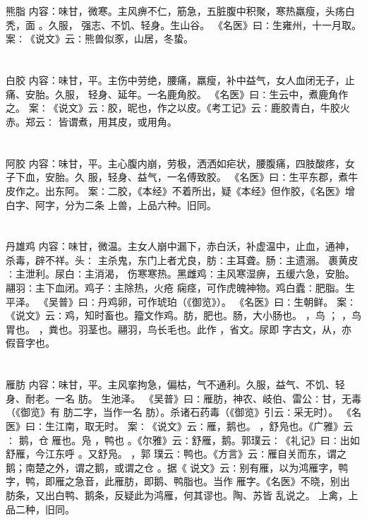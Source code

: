 \documentclass[12pt,UTF8]{ctexbook}
\begin{document}
\chapter{}熊脂
内容：味甘，微寒。主风痹不仁，筋急，五脏腹中积聚，寒热羸瘦，头疡白秃，面 。久服， 
强志、不饥、轻身。生山谷。 
《名医》曰∶生雍州，十一月取。 
案∶《说文》云∶熊兽似豕，山居，冬蛰。 


\chapter{}白胶
内容：味甘，平。主伤中劳绝，腰痛，羸瘦，补中益气，女人血闭无子，止痛、安胎。久服， 
轻身、延年。一名鹿角胶。 
《名医》曰∶生云中，煮鹿角作之。 
案∶《说文》云∶胶，昵也，作之以皮。《考工记》云∶鹿胶青白，牛胶火赤。郑云∶ 
皆谓煮，用其皮，或用角。 


\chapter{}阿胶
内容：味甘，平。主心腹内崩，劳极，洒洒如疟状，腰腹痛，四肢酸疼，女子下血，安胎。久 
服，轻身、益气，一名傅致胶。 
《名医》曰∶生平东郡，煮牛皮作之。出东阿。 
案∶二胶，《本经》不着所出，疑《本经》但作胶，《名医》增白字、阿字，分为二条 
上兽，上品六种。旧同。 


\chapter{}丹雄鸡
内容：味甘，微温。主女人崩中漏下，赤白沃，补虚温中，止血，通神，杀毒，辟不祥。头∶ 
主杀鬼，东门上者尤良，肪∶主耳聋。肠∶主遗溺。 裹黄皮∶主泄利。尿白∶主消渴， 
伤寒寒热。黑雌鸡∶主风寒湿痹，五缓六急，安胎。翮羽∶主下血闭。鸡子∶主除热，火疮 
痫痉，可作虎魄神物。鸡白蠹∶肥脂。生平泽。 
《吴普》曰∶丹鸡卵，可作琥珀（《御览》）。 
《名医》曰∶生朝鲜。 
案∶《说文》云∶鸡，知时畜也。籀文作鸡。肪，肥也。肠，大小肠也。 ，鸟 ； 
，鸟胃也。 ，粪也。羽茎也。翮羽，鸟长毛也。此作 ，省文。尿即 字古文，从，亦 
假音字也。 


\chapter{}雁肪
内容：味甘，平。主风挛拘急，偏枯，气不通利。久服，益气、不饥、轻身、耐老。一名 肪。 
生池泽。 
《吴普》曰∶雁肪，神农、岐伯、雷公∶甘，无毒（《御览》有 肪二字，当作一名 
肪）。杀诸石药毒（《御览》引云∶采无时）。 
《名医》曰∶生江南，取无时。 
案∶《说文》云∶雁，鹅也。 ，舒凫也。《广雅》云∶ 鹅，仓 雁也。凫 ，鸭也 
。《尔雅》云∶舒雁，鹅。郭璞云∶《礼记》曰∶出如舒雁，今江东呼 。又舒凫。 ，郭 
璞云∶鸭也。《方言》云∶雁自关而东，谓之 鹅；南楚之外，谓之鹅，或谓之仓 。据《 
说文》云∶别有雁，以为鸿雁字，鸭字，鸭，即雁之急音，此雁肪，即鹅、鸭脂也。当作 
雁字。《名医》不晓，别出 肪条，又出白鸭、鹅条，反疑此为鸿雁，何其谬也。陶、苏皆 
乱说之。 
上禽，上品二种，旧同。 
\end{document}
